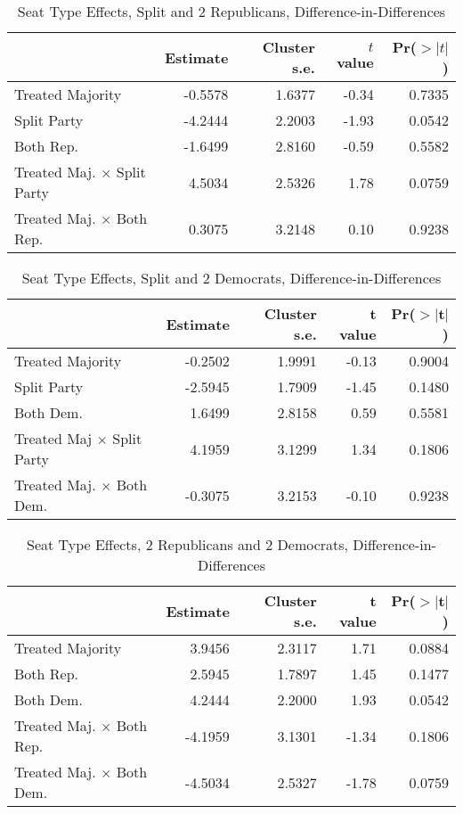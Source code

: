 \documentclass[12pt]{article}
\begin{document}
\begin{table}[H]
	\centering
	\caption{Seat Type Effects, Split and 2 Republicans, Difference-in-Differences} 
	\begin{tabular}{lrrrr}
		\hline
		& Estimate & Cluster s.e. & $t$ value & Pr($>|t|$) \\ 
		\hline
		Treated Majority & -0.5578 & 1.6377 & -0.34 & 0.7335 \\ 
		Split Party & -4.2444 & 2.2003 & -1.93 & 0.0542 \\ 
		Both Rep. & -1.6499 & 2.8160 & -0.59 & 0.5582 \\ 
		Treated Maj. $ \times $ Split Party & 4.5034 & 2.5326 & 1.78 & 0.0759 \\ 
		Treated Maj. $ \times $ Both Rep. & 0.3075 & 3.2148 & 0.10 & 0.9238 \\ 
		\hline
	\end{tabular}
\end{table}

\begin{table}[H]
	\centering
	\caption{Seat Type Effects, Split and 2 Democrats, Difference-in-Differences} 
	\begin{tabular}{lrrrr}
		\hline
		& Estimate & Cluster s.e. & t value & Pr($>$$|$t$|$) \\ 
		\hline
		Treated Majority & -0.2502 & 1.9991 & -0.13 & 0.9004 \\ 
		Split Party & -2.5945 & 1.7909 & -1.45 & 0.1480 \\ 
		Both Dem. & 1.6499 & 2.8158 & 0.59 & 0.5581 \\ 
		Treated Maj $ \times $ Split Party & 4.1959 & 3.1299 & 1.34 & 0.1806 \\ 
		Treated Maj. $ \times $ Both Dem. & -0.3075 & 3.2153 & -0.10 & 0.9238 \\ 
		\hline
	\end{tabular}
\end{table}

\begin{table}[H]
	\centering
	\caption{Seat Type Effects, 2 Republicans and 2 Democrats, Difference-in-Differences} 
	\begin{tabular}{lrrrr}
		\hline
		& Estimate & Cluster s.e. & t value & Pr($>$$|$t$|$) \\ 
		\hline
		Treated Majority & 3.9456 & 2.3117 & 1.71 & 0.0884 \\ 
		Both Rep. & 2.5945 & 1.7897 & 1.45 & 0.1477 \\ 
		Both Dem. & 4.2444 & 2.2000 & 1.93 & 0.0542 \\ 
		Treated Maj. $ \times $ Both Rep. & -4.1959 & 3.1301 & -1.34 & 0.1806 \\ 
		Treated Maj. $ \times $ Both Dem. & -4.5034 & 2.5327 & -1.78 & 0.0759 \\ 
		\hline
	\end{tabular}
\end{table}
\end{document}
